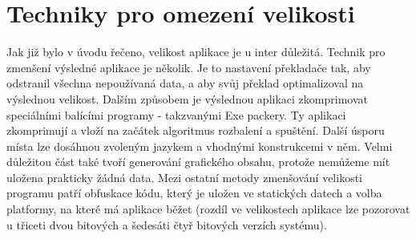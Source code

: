 
\chapter{Techniky pro omezení velikosti}
Jak již bylo v úvodu řečeno, velikost aplikace je u inter důležitá.
Technik pro zmenšení výsledné aplikace je několik.
Je to nastavení překladače tak, aby odstranil všechna ne\-po\-u\-ží\-va\-ná data, a aby svůj překlad optimalizoval na výslednou velikost.
Dalším způsobem je výslednou aplikaci zkomprimovat speciálními balícími programy - takzvanými Exe packery.
Ty aplikaci zkomprimují a vloží na začátek algoritmus rozbalení a spuštění.
Další úsporu místa lze dosáhnou zvoleným jazykem a vhodnými konstrukcemi v něm.
Velmi důležitou část také tvoří generování grafického obsahu, protože nemůžeme mít uložena prakticky žádná data.
Mezi ostatní metody zmenšování velikosti programu patří obfuskace kódu, který je uložen ve statických datech a volba platformy, na které má aplikace běžet (rozdíl ve velikostech aplikace lze pozorovat u třiceti dvou bitových a šedesáti čtyř bitových verzích systému).

